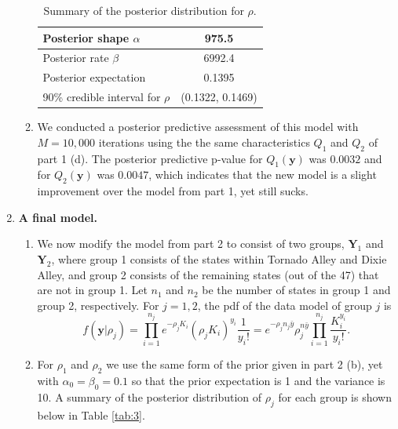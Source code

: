 \documentclass[12pt]{article}
\begin{document}
\begin{enumerate}[leftmargin=*]
\begin{enumerate}[leftmargin=1mm]
        \begin{table}[h!]
          \centering
          \begin{tabular}{lc}
            \hline
            Posterior shape $\alpha$ & 975.5 \\
            \hline
            Posterior rate $\beta$ & 6992.4  \\
            \hline
            Posterior expectation & 0.1395 \\
            \hline
            90\% credible interval for $\rho$ & (0.1322, 0.1469) \\
            \hline
          \end{tabular}
          \caption{Summary of the posterior distribution for $\rho$.}
          \label{tab:2}
        \end{table}

      \item We conducted a posterior predictive assessment of this model with $M = 10,000$ iterations 
        using the the same characteristics $Q_1$ and $Q_2$ of part 1 (d). The posterior predictive p-value for
        $Q_1(\bm{y})$ was $0.0032$ and for $Q_2(\bm{y})$ was $0.0047$, which indicates that the new model is a slight improvement over the model from
        part 1, yet still sucks.

    \end{enumerate}

  \item \textbf{A final model.}

    \begin{enumerate}[leftmargin=1mm]
      \item We now modify the model from part 2 to consist of two groups, $\bm{Y}_1$ and $\bm{Y}_2$, where group 1 consists of the states
        within Tornado Alley and Dixie Alley, and group 2 consists of the remaining states (out of the 47) that are not in group 1.
        Let $n_1$ and $n_2$ be the number of states in group 1 and group 2, respectively. For $j = 1,2$, the pdf of the data model of group $j$ is 
        \[
          f(\bm{y}|\rho_j) = \prod_{i=1}^{n_j} e^{-\rho_j K_i}(\rho_j K_i)^{y_i} \frac{1}{y_i!} = e^{-\rho_j n_j\bar{y}}\rho_j^{n\bar{y}}
          \prod_{i=1}^{n_j}\frac{K_i^{y_i}}{y_i!}.
        \]

      \item For $\rho_1$ and $\rho_2$ we use the same form of the prior given in part 2 (b), yet with $\alpha_0 = \beta_0 = 0.1$ so that the prior
        expectation is 1 and the variance is 10. A summary of the posterior distribution of $\rho_j$ for each group is shown below in Table
        \ref{tab:3}.


\end{enumerate}
\end{enumerate}
\end{document}
